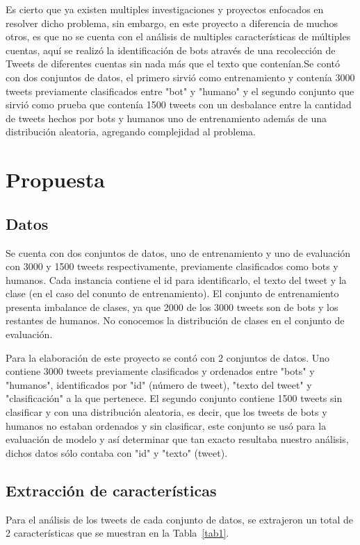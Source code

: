 \documentclass[runningheads]{llncs}
\begin{document}
Es cierto que ya existen multiples investigaciones y proyectos enfocados en resolver dicho problema, sin embargo, en este proyecto a diferencia de muchos otros, es que no se cuenta con el análisis de multiples características de múltiples cuentas, aquí se realizó la identificación de bots através de una recolección de Tweets de diferentes cuentas sin nada más que el texto que contenían.Se contó con dos conjuntos de datos, el primero sirvió como entrenamiento y contenía 3000 tweets previamente clasificados entre "bot" y "humano" y el segundo conjunto que sirvió como prueba que contenía 1500 tweets con un desbalance entre la cantidad de tweets hechos por bots y humanos uno de entrenamiento además de una distribución aleatoria, agregando complejidad al problema.

\section{Propuesta} \label{Proposal}

\subsection{Datos} \label{Data}
Se cuenta con dos conjuntos de datos, uno de entrenamiento y uno de evaluación con 3000 y 1500 tweets respectivamente, previamente clasificados como bots y humanos. Cada instancia contiene el id para identificarlo, el texto del tweet y la clase (en el caso del conunto de entrenamiento). El conjunto de entrenamiento presenta imbalance de clases, ya que 2000 de los 3000 tweets son de bots y los restantes de humanos. No conocemos la distribución de clases en el conjunto de evaluación.

Para la elaboración de este proyecto se contó con 2 conjuntos de datos. Uno contiene 3000 tweets previamente clasificados y ordenados entre "bots" y "humanos", identificados por "id" (número de tweet), "texto del tweet" y "clasificación" a la que pertenece. El segundo conjunto contiene 1500 tweets sin clasificar y con una distribución aleatoria, es decir, que los tweets de bots y humanos no estaban ordenados y sin clasificar, este conjunto se usó para la evaluación de modelo y así determinar que tan exacto resultaba nuestro análisis, dichos datos sólo contaba con "id" y "texto" (tweet).

\subsection{Extracción de características}
Para el análisis de los tweets de cada conjunto de datos, se extrajeron un total de 2 características que se muestran en la Tabla~\ref{tab1}.
\end{document}
